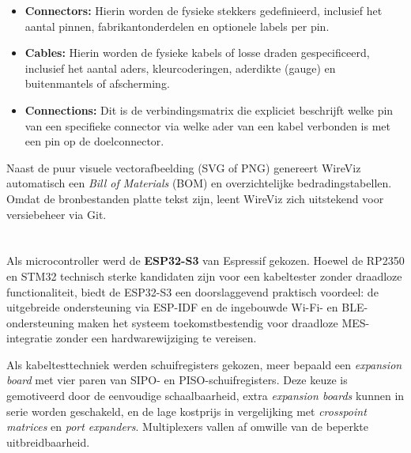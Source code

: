 \begin{itemize}
    
    \item \textbf{Connectors:} Hierin worden de fysieke stekkers gedefinieerd, inclusief het aantal pinnen, fabrikantonderdelen en optionele labels per pin.
    
    \item \textbf{Cables:} Hierin worden de fysieke kabels of losse draden gespecificeerd, inclusief het aantal aders, kleurcoderingen, aderdikte (gauge) en buitenmantels of afscherming.
    
    \item \textbf{Connections:} Dit is de verbindingsmatrix die expliciet beschrijft welke pin van een specifieke connector via welke ader van een kabel verbonden is met een pin op de doelconnector.
    
\end{itemize}

Naast de puur visuele vectorafbeelding (SVG of PNG) genereert WireViz automatisch een \textit{Bill of Materials} (BOM) en overzichtelijke bedradingstabellen. Omdat de bronbestanden platte tekst zijn, leent WireViz zich uitstekend voor versiebeheer via Git. 


\section{}%
\label{sec:conclusie-conceptueel}

Als microcontroller werd de \textbf{ESP32-S3} van Espressif gekozen. Hoewel de RP2350 en STM32 technisch sterke kandidaten zijn voor een kabeltester zonder draadloze functionaliteit, biedt de ESP32-S3 een doorslaggevend praktisch voordeel: de uitgebreide ondersteuning via \gls{ESP-IDF} en de ingebouwde Wi-Fi- en BLE-ondersteuning maken het systeem toekomstbestendig voor draadloze \gls{MES}-integratie zonder een hardwarewijziging te vereisen.

Als kabeltesttechniek werden schuifregisters gekozen, meer bepaald een \textit{expansion board} met vier paren van \gls{SIPO}- en \gls{PISO}-schuifregisters. Deze keuze is gemotiveerd door de eenvoudige schaalbaarheid, extra \textit{expansion boards} kunnen in serie worden geschakeld, en de lage kostprijs in vergelijking met \textit{crosspoint matrices} en \textit{port expanders}. Multiplexers vallen af omwille van de beperkte uitbreidbaarheid.

